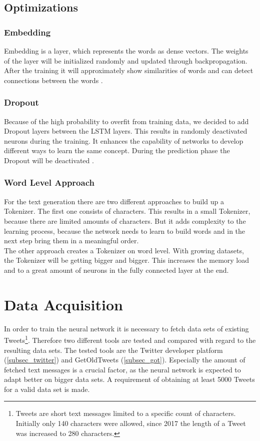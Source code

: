 \documentclass[conference]{IEEEtran}
\begin{document}
\subsection{Optimizations}

\subsubsection{Embedding}

Embedding is a layer, which represents the words as dense vectors. The weights of the layer will be initialized randomly and updated through backpropagation. After the training it will approximately show similarities of words and can detect connections between the words \cite{tim4}.

\subsubsection{Dropout}

Because of the high probability to overfit from training data, we decided to add Dropout layers between the LSTM layers. This results in randomly deactivated neurons during the training. It enhances the capability of networks to develop different ways to learn the same concept. During the prediction phase the Dropout will be deactivated \cite{tim5}.

\subsubsection{Word Level Approach}

For the text generation there are two different approaches to build up a Tokenizer. The first one consists of characters. This results in a small Tokenizer, because there are limited amounts of characters. But it adds complexity to the learning process, because the network needs to learn to build words and in the next step bring them in a meaningful order.\\
The other approach creates a Tokenizer on word level. With growing datasets, the Tokenizer will be getting bigger and bigger. This increases the memory load and to a great amount of neurons in the fully connected layer at the end.

\section{Data Acquisition}

In order to train the neural network it is necessary to fetch data sets of existing Tweets\footnote{Tweets are short text messages limited to a specific count of characters. Initially only 140 characters were allowed, since 2017 the length of a Tweet was increased to 280 characters.}. Therefore two different tools are tested and compared with regard to the resulting data sets. The tested tools are the Twitter developer platform \cite{twidev} (\ref{subsec_twitter}) and GetOldTweets \cite{got} (\ref{subsec_got}). Especially the amount of fetched text messages  is a crucial factor, as the neural network is expected to adapt better on bigger data sets. A requirement of obtaining at least 5000 Tweets for a valid data set is made.
\end{document}
